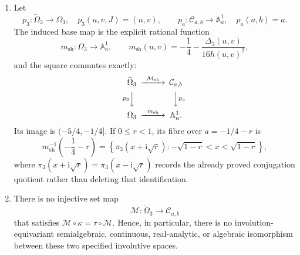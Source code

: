 \begin{theorem}
\begin{enumerate}
\item Let
\[
 p_3:\widetilde\Omega_3\to\Omega_3,
 \quad p_3(u,v,J)=(u,v),
 \qquad
 p_{a}:\mathcal C_{a,b}\to\mathbb A^1_a,
 \quad p_a(a,b)=a.
\]
The induced base map is the explicit rational function
\begin{equation}
 m_{\mathrm{sh}}:\Omega_3\longrightarrow\mathbb A^1_a,
 \qquad
 m_{\mathrm{sh}}(u,v)
 =-\frac14-\frac{\Delta_3(u,v)}{16h(u,v)^2},
 \label{eq:n3-sheet-base-map}
\end{equation}
and the square commutes exactly:
\[
\begin{CD}
 \widetilde\Omega_3 @>{\mathcal M_{\mathrm{sh}}}>> \mathcal C_{a,b}\\
 @V{p_3}VV @VV{p_a}V\\
 \Omega_3 @>{m_{\mathrm{sh}}}>> \mathbb A^1_a.
\end{CD}
\]
Its image is $(-5/4,-1/4]$.  If $0\le r<1$, its fibre over
$a=-1/4-r$ is
\begin{equation}
 m_{\mathrm{sh}}^{-1}\!\left(-\frac14-r\right)
 =\left\{\pi_3(x+\mathrm i\sqrt r):
 -\sqrt{1-r}<x<\sqrt{1-r}\right\},
 \label{eq:n3-sheet-base-fibres}
\end{equation}
where $\pi_3(x+\mathrm i\sqrt r)=\pi_3(x-\mathrm i\sqrt r)$ records the
already proved conjugation quotient rather than deleting that identification.

\item There is no injective set map
\[
 \mathcal M:\widetilde\Omega_3\longrightarrow\mathcal C_{a,b}
 \]
that satisfies $\mathcal M\circ\kappa=\tau\circ\mathcal M$.  Hence, in
particular, there is no involution-equivariant semialgebraic, continuous,
real-analytic, or algebraic isomorphism between these two specified involutive
spaces.
\end{enumerate}
\end{theorem}

